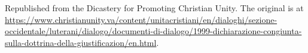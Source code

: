 \documentclass[11pt,letterpaper]{article}
\begin{document}
\color{ink}



\vspace{2em}
{\small\noindent Republished from the Dicastery for Promoting Christian Unity. The
original is at
\url{https://www.christianunity.va/content/unitacristiani/en/dialoghi/sezione-occidentale/luterani/dialogo/documenti-di-dialogo/1999-dichiarazione-congiunta-sulla-dottrina-della-giustificazion/en.html}.\par}
\end{document}
